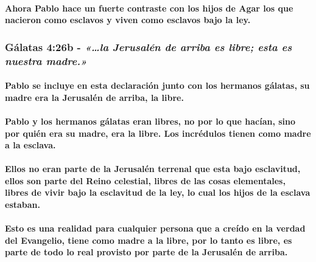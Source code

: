 \documentclass[11a pt,twoside]{article}
\newcommand{\scripture}[1]{%
  {\fontsize{12pt}{16pt}\selectfont\ScriptureFont\itshape #1}%
}
\let\oldsubsubsection\subsubsection
\renewcommand{\subsubsection}{\needspace{4\baselineskip}\oldsubsubsection}
\let\oldparagraph\paragraph
\renewcommand{\paragraph}{\needspace{3\baselineskip}\oldparagraph}
\begin{document}
\paragraph{Ahora Pablo hace un fuerte contraste con los hijos de Agar
los que nacieron como esclavos y viven como esclavos bajo la
ley.}\label{ahora-pablo-hace-un-fuerte-contraste-con-los-hijos-de-agar-los-que-nacieron-como-esclavos-y-viven-como-esclavos-bajo-la-ley.}

\subsubsection{\texorpdfstring{Gálatas 4:26b -
\scripture{«…la Jerusalén de arriba es libre; esta es nuestra madre.»}}{Gálatas 4:26b - }}\label{guxe1latas-426b---la-jerusaluxe9n-de-arriba-es-libre-esta-es-nuestra-madre.}

\paragraph{Pablo se incluye en esta declaración junto con los hermanos
gálatas, su madre era la Jerusalén de arriba, la
libre.}\label{pablo-se-incluye-en-esta-declaraciuxf3n-junto-con-los-hermanos-guxe1latas-su-madre-era-la-jerusaluxe9n-de-arriba-la-libre.}

\paragraph{Pablo y los hermanos gálatas eran libres, no por lo que
hacían, sino por quién era su madre, era la libre. Los incrédulos tienen
como madre a la
esclava.}\label{pablo-y-los-hermanos-guxe1latas-eran-libres-no-por-lo-que-hacuxedan-sino-por-quiuxe9n-era-su-madre-era-la-libre.-los-incruxe9dulos-tienen-como-madre-a-la-esclava.}

\paragraph{Ellos no eran parte de la Jerusalén terrenal que esta bajo
esclavitud, ellos son parte del Reino celestial, libres de las cosas
elementales, libres de vivir bajo la esclavitud de la ley, lo cual los
hijos de la esclava
estaban.}\label{ellos-no-eran-parte-de-la-jerusaluxe9n-terrenal-que-esta-bajo-esclavitud-ellos-son-parte-del-reino-celestial-libres-de-las-cosas-elementales-libres-de-vivir-bajo-la-esclavitud-de-la-ley-lo-cual-los-hijos-de-la-esclava-estaban.}

\paragraph{Esto es una realidad para cualquier persona que a creído en
la verdad del Evangelio, tiene como madre a la libre, por lo tanto es
libre, es parte de todo lo real provisto por parte de la Jerusalén de
arriba.}\label{esto-es-una-realidad-para-cualquier-persona-que-a-creuxeddo-en-la-verdad-del-evangelio-tiene-como-madre-a-la-libre-por-lo-tanto-es-libre-es-parte-de-todo-lo-real-provisto-por-parte-de-la-jerusaluxe9n-de-arriba.}
\end{document}
